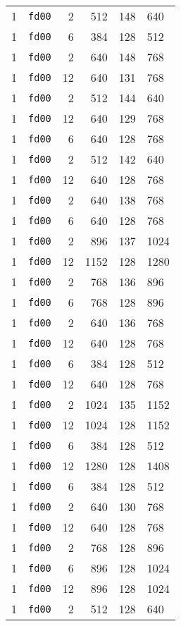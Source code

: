 \documentclass{article}
\begin{document}
\begin{table}[h!]
\begin{tabular}{llrrrl}
    1 & \texttt{fd00} & 2 & 512 & 148 & 640 \\
    1 & \texttt{fd00} & 6 & 384 & 128 & 512 \\
    1 & \texttt{fd00} & 2 & 640 & 148 & 768 \\
    1 & \texttt{fd00} & 12 & 640 & 131 & 768 \\
    1 & \texttt{fd00} & 2 & 512 & 144 & 640 \\
    1 & \texttt{fd00} & 12 & 640 & 129 & 768 \\
    1 & \texttt{fd00} & 6 & 640 & 128 & 768 \\
    1 & \texttt{fd00} & 2 & 512 & 142 & 640 \\
    1 & \texttt{fd00} & 12 & 640 & 128 & 768 \\
    1 & \texttt{fd00} & 2 & 640 & 138 & 768 \\
    1 & \texttt{fd00} & 6 & 640 & 128 & 768 \\
    1 & \texttt{fd00} & 2 & 896 & 137 & 1024 \\
    1 & \texttt{fd00} & 12 & 1152 & 128 & 1280 \\
    1 & \texttt{fd00} & 2 & 768 & 136 & 896 \\
    1 & \texttt{fd00} & 6 & 768 & 128 & 896 \\
    1 & \texttt{fd00} & 2 & 640 & 136 & 768 \\
    1 & \texttt{fd00} & 12 & 640 & 128 & 768 \\
    1 & \texttt{fd00} & 6 & 384 & 128 & 512 \\
    1 & \texttt{fd00} & 12 & 640 & 128 & 768 \\
    1 & \texttt{fd00} & 2 & 1024 & 135 & 1152 \\
    1 & \texttt{fd00} & 12 & 1024 & 128 & 1152 \\
    1 & \texttt{fd00} & 6 & 384 & 128 & 512 \\
    1 & \texttt{fd00} & 12 & 1280 & 128 & 1408 \\
    1 & \texttt{fd00} & 6 & 384 & 128 & 512 \\
    1 & \texttt{fd00} & 2 & 640 & 130 & 768 \\
    1 & \texttt{fd00} & 12 & 640 & 128 & 768 \\
    1 & \texttt{fd00} & 2 & 768 & 128 & 896 \\
    1 & \texttt{fd00} & 6 & 896 & 128 & 1024 \\
    1 & \texttt{fd00} & 12 & 896 & 128 & 1024 \\
    1 & \texttt{fd00} & 2 & 512 & 128 & 640 \\

\end{tabular}
\end{table}
\end{document}
